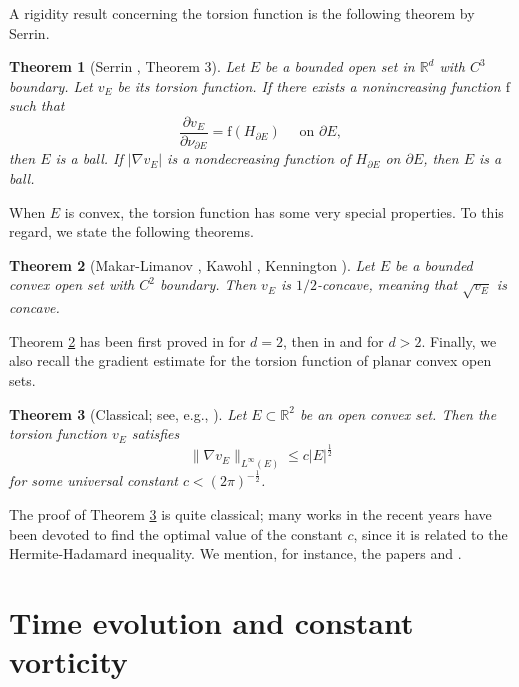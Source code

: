 \documentclass[10pt,reqno,a4paper]{article}
\numberwithin{equation}{section}
\theoremstyle{plain}
\newtheorem{theorem}{Theorem}[section]
\theoremstyle{definition}
\newcommand{\R}{{\mathbb R}}
\newcommand{\pa}{\partial}
\begin{document}
A rigidity result concerning the torsion function is the following theorem by Serrin. 

 
\begin{theorem}[Serrin \cite{S}, Theorem 3] 
\label{thm:serrin}
Let $E$ be a bounded open set in $\R^d$ with $C^3$ boundary. 
Let $v_E$ be its torsion function. 
If there exists a nonincreasing function $\mathrm f$ such that
\begin{equation} \label{serrin.f.H}
\frac{\pa v_E}{\pa \nu_{\pa E}} = \mathrm f(H_{\pa E})\quad \text{ on }\pa E,
\end{equation}
then $E$ is a ball.
If $|\nabla v_E|$ is a nondecreasing function of $H_{\pa E}$ on $\pa E$, 
then $E$ is a ball. 
\end{theorem}

When $E$ is convex, the torsion function has some very special properties. 
To this regard, we state the following theorems. 

\begin{theorem}[Makar-Limanov \cite{ML}, Kawohl \cite{Kaw}, Kennington \cite{Ken}]
\label{thm:torsion.square.root.concave}
Let $E$ be a bounded convex open set with $C^2$ boundary. 
Then $v_E$ is $1/2$-concave, meaning that $\sqrt{v_E}$ is concave.
\end{theorem}

Theorem \ref{thm:torsion.square.root.concave}  has been  first  proved in \cite{ML} for $d=2$, 
then in \cite{Kaw} and \cite{Ken} for $d>2$. 
Finally, we also recall the gradient estimate for the torsion function of planar convex open sets.

\begin{theorem}[Classical; see, e.g., \cite{BBBH, HS}]
\label{teo:grad.estimate}
Let $E \subset \R^2$ be an open convex set. 
Then the torsion function $v_E$ satisfies
\[
\| \nabla v_E \|_{L^\infty(E)} \leq c |E|^\frac12
\]
for some universal constant $c < (2\pi)^{-\frac{1}2}$.
\end{theorem}

The proof of Theorem \ref{teo:grad.estimate} is quite classical;  
many works in the recent years have been devoted to find the optimal value   
of the constant $c$, since it is related to the Hermite-Hadamard inequality.  
We mention, for instance, the papers \cite{BBBH} and \cite{HS}.


\section{Time evolution and constant vorticity}
\label{sec:symmetry}
\end{document}
